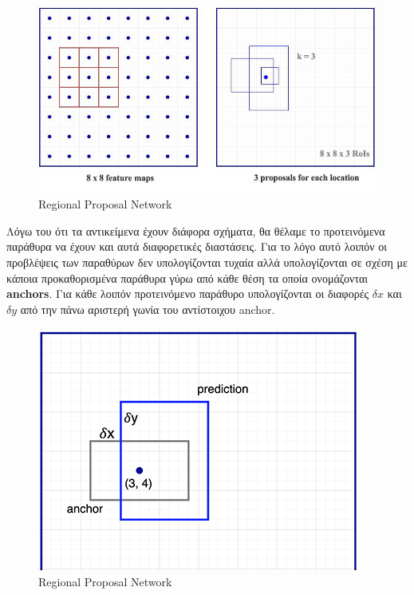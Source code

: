 \begin{figure}[htbp]
  \begin{center}
    \includegraphics[width=1.4\maxwidth]{../figures/rpn.png}
    \caption{Regional Proposal Network\label{fig:rpn}}
   \end{center}
\end{figure}

Λόγω του ότι τα αντικείμενα έχουν διάφορα σχήματα, θα θέλαμε το προτεινόμενα
παράθυρα να έχουν και αυτά διαφορετικές διαστάσεις. Για το λόγο αυτό λοιπόν οι
προβλέψεις  των παραθύρων δεν υπολογίζονται τυχαία αλλά υπολογίζονται σε σχέση
με κάποια προκαθορισμένα παράθυρα γύρω από κάθε θέση τα οποία ονομάζονται
\textbf{anchors}. Για κάθε λοιπόν προτεινόμενο παράθυρο υπολογίζονται οι διαφορές
$δx$ και $δy$ από την πάνω αριστερή γωνία του αντίστοιχου anchor.

\begin{figure}[htbp]
  \begin{center}
    \includegraphics[width=0.4\maxwidth]{../figures/anchor.png}
    \caption{Regional Proposal Network\label{fig:anchor}}
   \end{center}
\end{figure}

